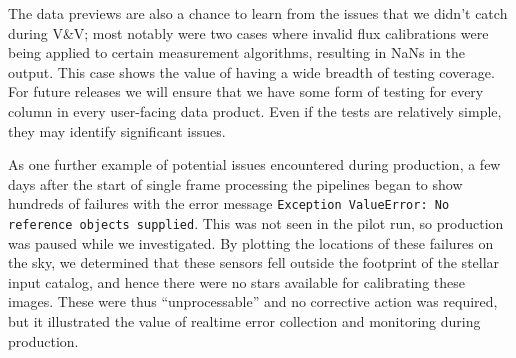 The data previews are also a chance to learn from the issues that we didn’t catch during V\&V; most
notably were two cases where invalid flux calibrations were being applied to certain measurement
algorithms, resulting in NaNs in the output. This case shows the value of having a wide breadth of
testing coverage. For future releases we will ensure that we have some form of testing for every
column in every user-facing data product. Even if the tests are relatively simple, they may identify
significant issues.

As one further example of potential issues encountered during production, a few days after the start
of single frame processing the pipelines began to show hundreds of failures with the error message
\texttt{Exception ValueError: No reference objects supplied}. This was not seen in the pilot run, so
production was paused while we investigated. By plotting the locations of these failures on the sky,
we determined that these sensors fell outside the footprint of the stellar input catalog, and hence
there were no stars available for calibrating these images. These were thus “unprocessable” and no
corrective action was required, but it illustrated the value of realtime error collection and
monitoring during production.

